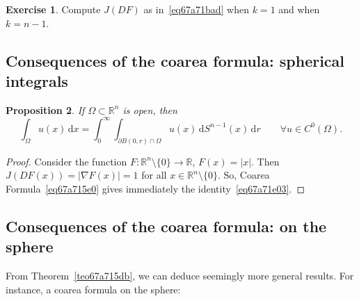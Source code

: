 \documentclass[a4paper,9pt]{amsart}
\newcommand{\R}{\mathbb{R}}	%
\newcommand{\did}{\,\mathrm{d}}	%
\newcommand{\de}{\partial}		%
\newcommand{\grad}{\nabla}
\theoremstyle{plain}
\newtheorem{proposition}{Proposition}[section]
\theoremstyle{definition}
\newtheorem{exercise}[proposition]{Exercise}%
\theoremstyle{remark}
\begin{document}
\begin{exercise}
	Compute $J(DF)$ as in~\eqref{eq67a71bad} when $k=1$ and when $k=n-1$.
\end{exercise}

\subsection{Consequences of the coarea formula: spherical integrals}

\begin{proposition}
	If $\Omega\subset\R^n$ is open, then 
	\begin{equation}\label{eq67a71e03}
		\int_{\Omega} u(x) \did x 
		= \int_0^\infty \int_{\de B(0,r)\cap \Omega} u(x) \did S^{n-1}(x) \did r 
		\qquad \forall u\in C^0(\Omega).
	\end{equation}
\end{proposition}
\begin{proof}
	Consider the function $F:\R^n\setminus\{0\}\to\R$, $F(x) = |x|$.
	Then $J(DF(x)) = |\grad F(x)| = 1$ for all $x\in \R^n\setminus\{0\}$.
	So, Coarea Formula~\eqref{eq67a715e0} gives immediately the identity~\eqref{eq67a71e03}.
\end{proof}



\subsection{Consequences of the coarea formula: on the sphere}
From Theorem~\ref{teo67a715db}, we can deduce seemingly more general results.
For instance, a coarea formula on the sphere:
\end{document}
